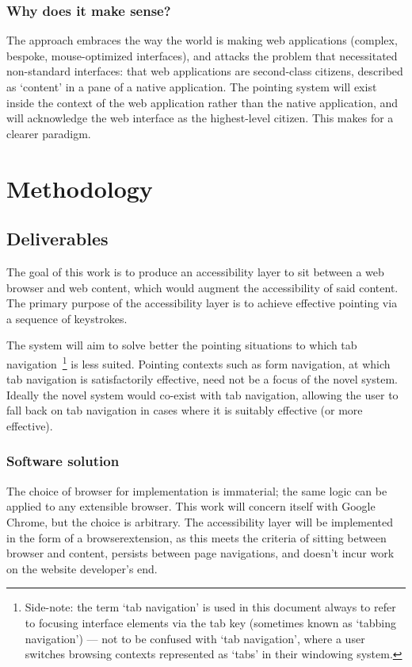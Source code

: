 \documentclass[a4paper, 12pt]{report}
\begin{document}
\subsubsection{Why does it make sense?}
The approach embraces the way the world is making web applications (complex, bespoke, mouse-optimized interfaces), and attacks the problem that necessitated non-standard interfaces: that web applications are second-class citizens, described as `content' in a pane of a native application.
The pointing system will exist inside the context of the web application rather than the native application, and will acknowledge the web interface as the highest-level citizen. This makes for a clearer paradigm.
\section{Methodology}
\subsection{Deliverables}
The goal of this work is to produce an accessibility layer to sit between a web browser and web content, which would augment the accessibility of said content.
The primary purpose of the accessibility layer is to achieve effective pointing via a sequence of keystrokes.

The system will aim to solve better the pointing situations to which tab navigation~\footnote{Side-note: the term `tab navigation' is used in this document always to refer to focusing interface elements via the tab key (sometimes known as `tabbing navigation') --- not to be confused with `tab navigation', where a user switches browsing contexts represented as `tabs' in their windowing system.} is less suited. Pointing contexts such as form navigation, at which tab navigation is satisfactorily effective, need not be a focus of the novel system. Ideally the novel system would co-exist with tab navigation, allowing the user to fall back on tab navigation in cases where it is suitably effective (or more effective).
\subsubsection{Software solution}
\label{sec:softwaresolution}
The choice of browser for implementation is immaterial; the same logic can be applied to any extensible browser. This work will concern itself with Google Chrome, but the choice is arbitrary.
The accessibility layer will be implemented in the form of a \gls{browserextension}, as this meets the criteria of sitting between browser and content, persists between page navigations, and doesn't incur work on the website developer's end.
\end{document}
